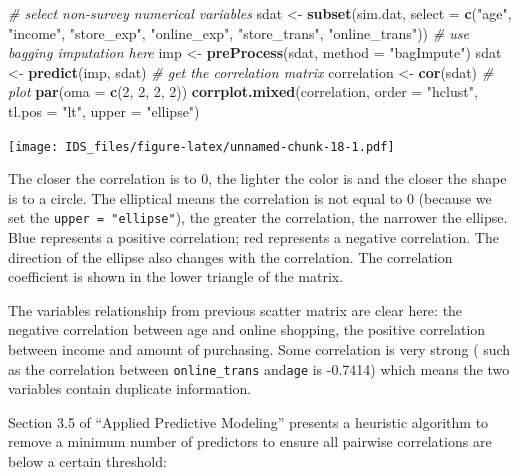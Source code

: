 \documentclass[12pt,]{krantz}
\makeatletter
\newenvironment{Shaded}{\begin{snugshade}}{\end{snugshade}}
\newcommand{\CommentTok}[1]{\textcolor[rgb]{0.37,0.37,0.37}{\textit{#1}}}
\newcommand{\DataTypeTok}[1]{\textcolor[rgb]{0.27,0.27,0.27}{#1}}
\newcommand{\DecValTok}[1]{\textcolor[rgb]{0.06,0.06,0.06}{#1}}
\newcommand{\KeywordTok}[1]{\textcolor[rgb]{0.27,0.27,0.27}{\textbf{#1}}}
\newcommand{\NormalTok}[1]{#1}
\newcommand{\StringTok}[1]{\textcolor[rgb]{0.5,0.5,0.5}{#1}}
\newenvironment{kframe}{%
\medskip{}
\setlength{\fboxsep}{.8em}
 \def\at@end@of@kframe{}%
 \ifinner\ifhmode%
  \def\at@end@of@kframe{\end{minipage}}%
  \begin{minipage}{\columnwidth}%
 \fi\fi%
 \def\FrameCommand##1{\hskip\@totalleftmargin \hskip-\fboxsep
 \colorbox{shadecolor}{##1}\hskip-\fboxsep
     \hskip-\linewidth \hskip-\@totalleftmargin \hskip\columnwidth}%
 \MakeFramed {\advance\hsize-\width
   \@totalleftmargin\z@ \linewidth\hsize
   \@setminipage}}%
 {\par\unskip\endMakeFramed%
 \at@end@of@kframe}
\renewenvironment{Shaded}{\begin{kframe}}{\end{kframe}}
\makeatother
\begin{document}
\begin{Shaded}
\begin{Highlighting}[]
\CommentTok{# select non-survey numerical variables}
\NormalTok{sdat <-}\StringTok{ }\KeywordTok{subset}\NormalTok{(sim.dat, }\DataTypeTok{select =} \KeywordTok{c}\NormalTok{(}\StringTok{"age"}\NormalTok{, }\StringTok{"income"}\NormalTok{, }\StringTok{"store_exp"}\NormalTok{, }
    \StringTok{"online_exp"}\NormalTok{, }\StringTok{"store_trans"}\NormalTok{, }\StringTok{"online_trans"}\NormalTok{))}
\CommentTok{# use bagging imputation here}
\NormalTok{imp <-}\StringTok{ }\KeywordTok{preProcess}\NormalTok{(sdat, }\DataTypeTok{method =} \StringTok{"bagImpute"}\NormalTok{)}
\NormalTok{sdat <-}\StringTok{ }\KeywordTok{predict}\NormalTok{(imp, sdat)}
\CommentTok{# get the correlation matrix}
\NormalTok{correlation <-}\StringTok{ }\KeywordTok{cor}\NormalTok{(sdat)}
\CommentTok{# plot}
\KeywordTok{par}\NormalTok{(}\DataTypeTok{oma =} \KeywordTok{c}\NormalTok{(}\DecValTok{2}\NormalTok{, }\DecValTok{2}\NormalTok{, }\DecValTok{2}\NormalTok{, }\DecValTok{2}\NormalTok{))}
\KeywordTok{corrplot.mixed}\NormalTok{(correlation, }\DataTypeTok{order =} \StringTok{"hclust"}\NormalTok{, }\DataTypeTok{tl.pos =} \StringTok{"lt"}\NormalTok{, }
    \DataTypeTok{upper =} \StringTok{"ellipse"}\NormalTok{)}
\end{Highlighting}
\end{Shaded}

\texttt{[image: IDS\_files/figure-latex/unnamed-chunk-18-1.pdf]}

The closer the correlation is to 0, the lighter the color is and the closer the shape is to a circle. The elliptical means the correlation is not equal to 0 (because we set the \texttt{upper\ =\ "ellipse"}), the greater the correlation, the narrower the ellipse. Blue represents a positive correlation; red represents a negative correlation. The direction of the ellipse also changes with the correlation. The correlation coefficient is shown in the lower triangle of the matrix.

The variables relationship from previous scatter matrix are clear here: the negative correlation between age and online shopping, the positive correlation between income and amount of purchasing. Some correlation is very strong ( such as the correlation between \texttt{online\_trans} and\texttt{age} is -0.7414) which means the two variables contain duplicate information.

Section 3.5 of ``Applied Predictive Modeling'' \citep{APM} presents a heuristic algorithm to remove a minimum number of predictors to ensure all pairwise correlations are below a certain threshold:
\end{document}
